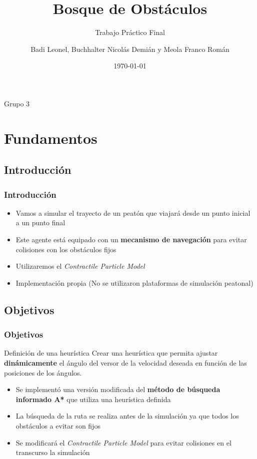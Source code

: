 \documentclass[hyperref={pdfpagelayout=SinglePage}]{beamer}
\title{Bosque de Obstáculos}
\subtitle{Trabajo Práctico Final}
\author{Badi Leonel, Buchhalter Nicolás Demián y Meola Franco Román}
\date{\today}
\makeatletter
\newcommand{\parttableofcontents}{\@starttoc{parttoc}}
\makeatother
\begin{document}
\begin{frame}[plain]
    \frametitle{} 
    \titlepage
    \centering
	Grupo 3
\end{frame}



\section{Fundamentos}

\subsection{Introducción}

\begin{frame}
\frametitle{Introducción}
\begin{itemize}
	\item Vamos a simular el trayecto de un peatón que viajará desde un punto inicial a un punto final
	\item Este agente está equipado con un \textbf{mecanismo de navegación} para evitar colisiones con los obstáculos fijos
	\item Utilizaremos el \textit{Contractile Particle Model}
	\item Implementación propia (No se utilizaron plataformas de simulación peatonal)
\end{itemize}
\end{frame}

\subsection{Objetivos}

\begin{frame}
\frametitle{Objetivos}
\begin{block}{Definición de una heurística}
Crear una heurística que permita ajustar \textbf{dinámicamente} el ángulo del versor de la velocidad deseada en función de las posiciones de los ángulos.
\end{block}
\begin{itemize}
	\item Se implementó una versión modificada del \textbf{método de búsqueda informado A*} que utiliza una heurística definida
	\item La búsqueda de la ruta se realiza antes de la simulación ya que todos los obstáculos a evitar son fijos
	\item Se modificará el \textit{Contractile Particle Model} para evitar colisiones en el transcurso la simulación  
\end{itemize}
\end{frame}
\end{document}
